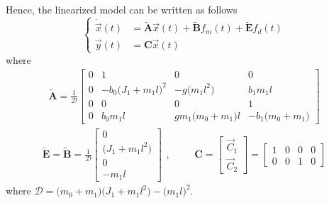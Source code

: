 \documentclass[11pt,a4paper,oneside]{book}
\numberwithin{equation}{section}
\theoremstyle{it}
\theoremstyle{definition}
\begin{document}
Hence, the linearized model can be written as follows
\begin{equation}\label{pendulum_on_cart_26}
	\left\lbrace 	\begin{aligned}
		\dot{\vec{x}}(t)&=\tilde{\mathbf{A}}\vec{x}(t)+\tilde{\mathbf{B}}f_m(t) +\tilde{\mathbf{E}}f_d(t) \\[6pt]
		\vec{y}(t)&=\mathbf{C}\vec{x}(t)
	\end{aligned}\right. 
\end{equation}
where
\begin{equation}\label{pendulum_on_cart_27}
	\begin{aligned}
		\tilde{\mathbf{A}}=\frac{1}{\mathcal{D}}\begin{bmatrix}
			0&1&0&0 \\[8pt]		
			0&-b_0\big(J_1+m_1l\big)^2&-g\big(m_1l^2\big)&b_1m_1l \\[8pt]
			0&0&0&1 \\[8pt]
			0&b_0m_1l&gm_1\big(m_0+m_1\big)l&-b_1\big(m_0+m_1\big) 
		\end{bmatrix}
	\end{aligned}
\end{equation}
\begin{equation}\label{pendulum_on_cart_28}
	\begin{aligned}
		\tilde{\mathbf{E}}=\tilde{\mathbf{B}}=\frac{1}{\mathcal{D}}\begin{bmatrix}
			0 \\[8pt]		
			\big(J_1+m_1l^2\big) \\[8pt]
			0 \\[8pt]
			-m_1l
		\end{bmatrix}
	\end{aligned},\qquad
	\begin{aligned}
		{\mathbf{C}}=\begin{bmatrix}
			\vec{C}_1 \\[8pt]		
			\vec{C}_2
		\end{bmatrix}=\begin{bmatrix}
			1&0&0&0 \\[8pt]		
			0&0&1&0
		\end{bmatrix}
	\end{aligned}
\end{equation}
where $\mathcal{D}=\big(m_0+m_1\big)\big(J_1+m_1l^2\big)-\big(m_1l\big)^2$.
\end{document}
